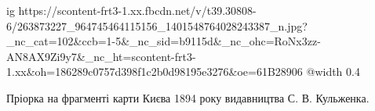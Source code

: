  
 
 
 
 

\ifcmt
  ig https://scontent-frt3-1.xx.fbcdn.net/v/t39.30808-6/263873227_964745464115156_1401548764028243387_n.jpg?_nc_cat=102&ccb=1-5&_nc_sid=b9115d&_nc_ohc=RoNx3zz-AN8AX9Zi9y7&_nc_ht=scontent-frt3-1.xx&oh=186289c0757d398f1c2b0d98195e3276&oe=61B28906
  @width 0.4
\fi


Пріорка на фрагменті карти Києва 1894 року видавництва С. В. Кульженка.
